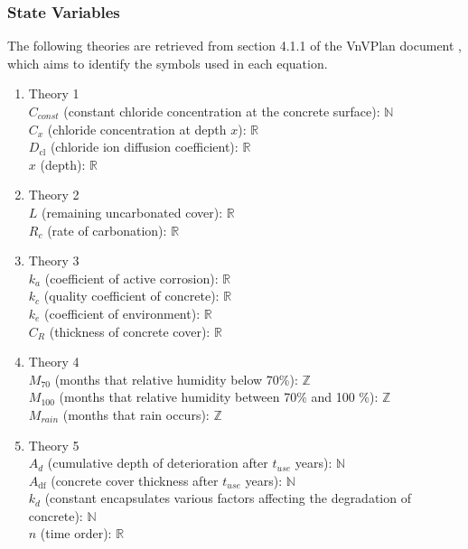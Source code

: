 \documentclass[12pt, titlepage]{article}
\begin{document}
\subsubsection{State Variables}
The following theories are retrieved from section 4.1.1 of the VnVPlan document \cite{VNV2024}, which aims to identify the symbols used in each equation.

\begin{enumerate}
    \item Theory 1 \\
    $C_{const}$ (constant chloride concentration at the concrete surface): $\mathbb{N}$ \\
    $C_x$ (chloride concentration at depth $x$): $\mathbb{R}$ \\
    $D_\text{cl}$ (chloride ion diffusion coefficient): $\mathbb{R}$\\
    $x$ (depth): $\mathbb{R}$\\
    
    \item Theory 2 \\
    $L$ (remaining uncarbonated cover): $\mathbb{R}$ \\
    $R_c$ (rate of carbonation): $\mathbb{R}$ \\
    
    \item Theory 3 \\
    $k_a$ (coefficient of active corrosion): $\mathbb{R}$ \\
    $k_c$ (quality coefficient of concrete): $\mathbb{R}$ \\
    $k_e$ (coefficient of environment): $\mathbb{R}$\\
    $C_R$ (thickness of concrete cover): $\mathbb{R}$\\
    
    \item Theory 4 \\
    $M_{70}$ (months that relative humidity below 70\%): $\mathbb{Z}$\\
    $M_{100}$ (months that relative humidity between 70\% and 100 \%): $\mathbb{Z}$\\
    $M_{rain}$ (months that rain occurs): $\mathbb{Z}$\\

    \item Theory 5 \\
    $A_d$ (cumulative depth of deterioration after $t_{use}$ years): $\mathbb{N}$\\
    $A_\text{df}$ (concrete cover thickness after $t_{use}$ years): $\mathbb{N}$\\
    $k_d$ (constant encapsulates various factors affecting the degradation of concrete): $\mathbb{N}$\\
    $n$ (time order): $\mathbb{R}$\\
\end{enumerate}
\end{document}
